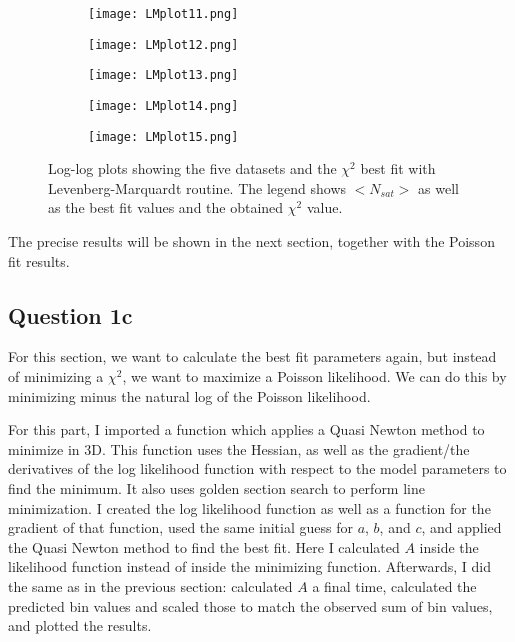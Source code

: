 \begin{figure}[ht!]
\begin{center}
        \begin{subfigure}{.49\textwidth}
      \centering
      \texttt{[image: LMplot11.png]}
    \end{subfigure}
    \vspace{-10pt}
    \begin{subfigure}{.49\textwidth}
      \centering
      \texttt{[image: LMplot12.png]} 
    \end{subfigure}
     \vspace{-10pt}
    \begin{subfigure}{.49\textwidth}
      \centering
      \texttt{[image: LMplot13.png]} 
    \end{subfigure}
     \vspace{-10pt}
    \begin{subfigure}{.49\textwidth}
      \centering
      \texttt{[image: LMplot14.png]} 
    \end{subfigure}
     \vspace{-10pt}
    \begin{subfigure}{.49\textwidth}
      \centering
      \texttt{[image: LMplot15.png]} 
    \end{subfigure}
    \caption{Log-log plots showing the five datasets and the $\chi^2$ best fit with Levenberg-Marquardt routine. The legend shows $<N_{sat}>$ as well as the best fit values and the obtained $\chi^2$ value.}
    \label{fig:LMfit}
\end{center}
\end{figure}

The precise results will be shown in the next section, together with the Poisson fit results.

\subsection{Question 1c}
For this section, we want to calculate the best fit parameters again, but instead of minimizing a $\chi^2$, we want to maximize a Poisson likelihood.
We can do this by minimizing minus the natural log of the Poisson likelihood.

For this part, I imported a function which applies a Quasi Newton method to minimize in 3D. 
This function uses the Hessian, as well as the gradient/the derivatives of the log likelihood function with respect to the model parameters to find the minimum. 
It also uses golden section search to perform line minimization.
I created the log likelihood function as well as a function for the gradient of that function, used the same initial guess for $a$, $b$, and $c$, and applied the Quasi Newton method to find the best fit.
Here I calculated $A$ inside the likelihood function instead of inside the minimizing function.
Afterwards, I did the same as in the previous section: calculated $A$ a final time, calculated the predicted bin values and scaled those to match the observed sum of bin values, and plotted the results.

